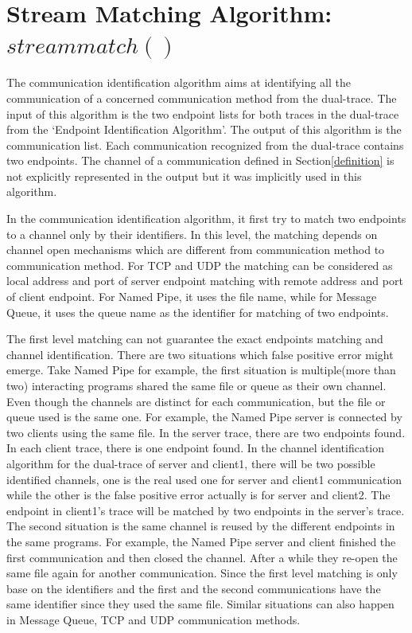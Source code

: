\section{Stream Matching Algorithm: $streammatch()$}
The communication identification algorithm aims at identifying all the communication of a concerned communication method from the dual-trace. The input of this algorithm is the two endpoint lists for both traces in the dual-trace from the `Endpoint Identification Algorithm'. The output of this algorithm is the communication list. Each communication recognized from the dual-trace contains two endpoints. The channel of a communication defined in Section\ref{definition} is not explicitly represented in the output but it was implicitly used in this algorithm. 

In the communication identification algorithm, it first try to match two endpoints to a channel only by their identifiers. In this level, the matching depends on channel open mechanisms which are different from communication method to communication method. For TCP and UDP the matching can be considered as local address and port of server endpoint matching with remote address and port of client endpoint. For Named Pipe, it uses the file name, while for Message Queue, it uses the queue name as the identifier for matching of two endpoints. 

The first level matching can not guarantee the exact endpoints matching and channel identification. There are two situations which false positive error might emerge. Take Named Pipe for example, the first situation is multiple(more than two) interacting programs shared the same file or queue as their own channel. Even though the channels are distinct for each communication, but the file or queue used is the same one. For example, the Named Pipe server is connected by two clients using the same file. In the server trace, there are two endpoints found. In each client trace, there is one endpoint found. In the channel identification algorithm for the dual-trace of server and client1, there will be two possible identified channels, one is the real used one for server and client1 communication while the other is the false positive error actually is for server and client2. The endpoint in client1's trace will be matched by two endpoints in the server's trace. The second situation is the same channel is reused by the different endpoints in the same programs. For example, the Named Pipe server and client finished the first communication and then closed the channel. After a while they re-open the same file again for another communication. Since the first level matching is only base on the identifiers and the first and the second communications have the same identifier since they used the same file. Similar situations can also happen in Message Queue, TCP and UDP communication methods. 

